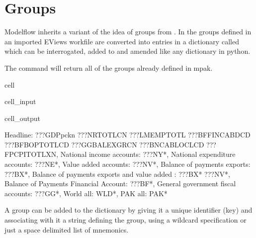 \documentclass[letterpaper,10pt,english]{jupyterBook}
\begin{document}
\section{Groups}
\label{\detokenize{content/05_WBModels/LoadingWBModel:groups}}
\sphinxAtStartPar
Modelflow inherits a variant of the idea of groups from .  In  the groups defined in an imported EViews workfile are converted into entries in a dictionary called  which can be interrogated, added to and amended like any dictionary in python.

\sphinxAtStartPar
The command
 will return all of the groups already defined in mpak.

\begin{sphinxuseclass}{cell}\begin{sphinxVerbatimInput}

\begin{sphinxuseclass}{cell_input}
\begin{sphinxVerbatim}[commandchars=\\\{\}]
\end{sphinxVerbatim}

\end{sphinxuseclass}\end{sphinxVerbatimInput}
\begin{sphinxVerbatimOutput}

\begin{sphinxuseclass}{cell_output}
\begin{sphinxVerbatim}[commandchars=\\\{\}]
\PYGZob{}\PYGZsq{}Headline\PYGZsq{}: \PYGZsq{}???GDPpckn ???NRTOTLCN ???LMEMPTOTL ???BFFINCABDCD  ???BFBOPTOTLCD ???GGBALEXGRCN ???BNCABLOCLCD\PYGZus{} ???FPCPITOTLXN\PYGZsq{},
 \PYGZsq{}National income accounts\PYGZsq{}: \PYGZsq{}???NY*\PYGZsq{},
 \PYGZsq{}National expenditure accounts\PYGZsq{}: \PYGZsq{}???NE*\PYGZsq{},
 \PYGZsq{}Value added accounts\PYGZsq{}: \PYGZsq{}???NV*\PYGZsq{},
 \PYGZsq{}Balance of payments exports\PYGZsq{}: \PYGZsq{}???BX*\PYGZsq{},
 \PYGZsq{}Balance of payments exports and value added \PYGZsq{}: \PYGZsq{}???BX* ???NV*\PYGZsq{},
 \PYGZsq{}Balance of Payments Financial Account\PYGZsq{}: \PYGZsq{}???BF*\PYGZsq{},
 \PYGZsq{}General government fiscal accounts\PYGZsq{}: \PYGZsq{}???GG*\PYGZsq{},
 \PYGZsq{}World all\PYGZsq{}: \PYGZsq{}WLD*\PYGZsq{},
 \PYGZsq{}PAK all\PYGZsq{}: \PYGZsq{}PAK*\PYGZsq{}\PYGZcb{}
\end{sphinxVerbatim}

\end{sphinxuseclass}\end{sphinxVerbatimOutput}

\end{sphinxuseclass}
\sphinxAtStartPar
A group can be added to the dictionary by giving it a unique identifier (key) and associating with it a string defining the group, using a wildcard specification or just a space de\sphinxhyphen{}limited list of mnemonics.
\end{document}
